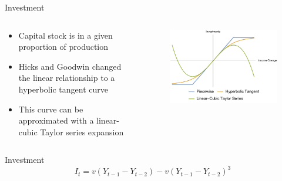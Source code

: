 \documentclass{beamer}
\begin{document}
\begin{frame}{Investment}
	\begin{columns}
		\begin{column}{0.5\textwidth}
				\begin{itemize}
					\item
						Capital stock is in a given proportion of production\autocite{Press1939}

					\item
						Hicks and Goodwin changed the linear relationship to a hyperbolic tangent curve
					\item
						This curve can be approximated with a linear-cubic Taylor series expansion
				\end{itemize}
		\end{column}
		\begin{column}{0.5\textwidth}
			\begin{figure}
				\centering
				\includegraphics[width=\textwidth]{investment_curve.pdf}
			\end{figure}
		\end{column}
	\end{columns}
\end{frame}

\begin{frame}{Investment}
	\begin{equation*}
		I_t=v(Y_{t-1}-Y_{t-2})-v(Y_{t-1}-Y_{t-2})^3
	\end{equation*}
\end{frame}
\end{document}
